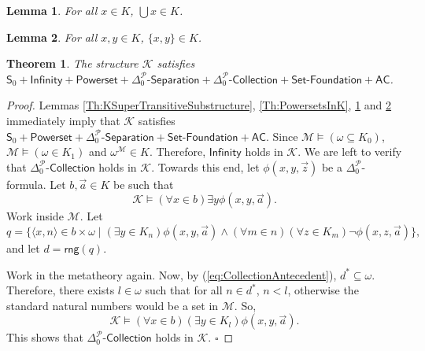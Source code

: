 \documentclass[10pt,a4paper]{amsart}
\newtheorem{lemma}{Lemma}
\newtheorem{theorem}{Theorem}
\begin{document}
\begin{lemma} \label{Th:UnionsInK}
For all $x \in K$, $\bigcup x \in K$.
\end{lemma}

\begin{lemma} \label{Th:PairingInK}
For all $x, y \in K$, $\{x, y\} \in K$.
\end{lemma}

\begin{theorem}
The structure $\mathcal{K}$ satisfies $\mathsf{S}_0+\textsf{Infinity}+\textsf{Powerset}+\Delta_0^{\mathcal{P}}\textsf{-Separation}+\Delta_0^{\mathcal{P}}\textsf{-Collection}+\textsf{Set-Foundation}+\mathsf{AC}$.
\end{theorem}

\begin{proof}
Lemmas \ref{Th:KSuperTransitiveSubstructure}, \ref{Th:PowersetsInK}, \ref{Th:UnionsInK} and \ref{Th:PairingInK} immediately imply that $\mathcal{K}$ satisfies $\mathsf{S}_0+\textsf{Powerset}+\Delta_0^{\mathcal{P}}\textsf{-Separation}+\textsf{Set-Foundation}+\mathsf{AC}$. Since $\mathcal{M} \models (\omega \subseteq K_0)$, $\mathcal{M} \models (\omega \in K_1)$ and $\omega^{\mathcal{M}} \in K$. Therefore, $\textsf{Infinity}$ holds in $\mathcal{K}$. We are left to verify that $\Delta_0^{\mathcal{P}}\textsf{-Collection}$ holds in $\mathcal{K}$. Towards this end, let $\phi(x, y, \vec{z})$ be a $\Delta_0^{\mathcal{P}}$-formula. Let $b, \vec{a} \in K$ be such that 
\begin{equation} \label{eq:CollectionAntecedent}
\mathcal{K} \models (\forall x \in b)\exists y \phi(x, y, \vec{a}).
\end{equation}
Work inside $\mathcal{M}$. Let
\[
q= \{ \langle x, n \rangle \in b \times \omega \mid (\exists y \in K_n) \phi(x, y, \vec{a}) \land (\forall m \in n)(\forall z \in K_m) \neg \phi(x, z, \vec{a})\},
\]
and let $d= \mathsf{rng}(q)$.

Work in the metatheory again. Now, by (\ref{eq:CollectionAntecedent}), $d^* \subseteq \omega$. Therefore, there exists $l \in \omega$ such that for all $n \in d^*$, $n < l$, otherwise the standard natural numbers would be a set in $\mathcal{M}$. So, 
\[
\mathcal{K} \models (\forall x \in b)(\exists y \in K_l)\phi(x, y, \vec{a}).
\]
This shows that $\Delta_0^{\mathcal{P}}\textsf{-Collection}$ holds in $\mathcal{K}$. \hfill$\square$  
\end{proof}
\end{document}

